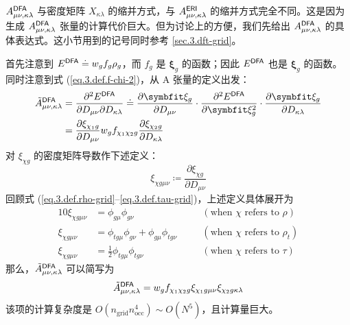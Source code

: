 $A_{\mu \nu, \kappa \lambda}^{\textsf{DFA}}$ 与密度矩阵 $X_{\kappa \lambda}$ 的缩并方式，与 $A_{\mu \nu, \kappa \lambda}^{\textsf{ERI}}$ 的缩并方式完全不同。这是因为生成 $A_{\mu \nu, \kappa \lambda}^{\textsf{DFA}}$ 张量的计算代价巨大。但为讨论上的方便，我们先给出 $A_{\mu \nu, \kappa \lambda}^{\textsf{DFA}}$ 的具体表达式。这小节用到的记号同时参考 \ref{sec.3.dft-grid}。

首先注意到 $E^{\textsf{DFA}} \doteq w_g f_g \rho_g$，而 $f_g$ 是 $\bm{\xi}_g$ 的函数；因此 $E^{\textsf{DFA}}$ 也是 $\bm{\xi}_g$ 的函数。同时注意到式 (\ref{eq.3.def.f-chi-2})，从 A 张量的定义出发：
\begin{align*}
    \tilde{A}_{\mu \nu, \kappa \lambda}^\textmt{DFA}
    &= \frac{\partial^2 E^\textmt{DFA}}{\partial D_{\mu \nu} \partial D_{\kappa \lambda}}
    \doteq \frac{\partial \bm{\xi}_g}{\partial {D_{\mu \nu}}} \cdot \frac{\partial^2 E^\textmt{DFA}}{\partial \bm{\xi}_g^2} \cdot \frac{\partial \bm{\xi}_g}{\partial {D_{\kappa \lambda}}} \\
    &= \frac{\partial \xi_{\chi_1 g}}{\partial {D_{\mu \nu}}} w_g f_{\chi_1 \chi_2 g} \frac{\partial \xi_{\chi_2 g}}{\partial {D_{\kappa \lambda}}}
\end{align*}
对 $\xi_{\chi g}$ 的密度矩阵导数作下述定义：
\begin{equation}
    \label{eq.3.def.xi-deriv-dm}
    \xi_{\chi g \mu \nu} \coloneq \frac{\partial \xi_{\chi g}}{\partial D_{\mu \nu}}
\end{equation}
回顾式 (\ref{eq.3.def.rho-grid}--\ref{eq.3.def.tau-grid})，上述定义具体展开为
\begin{alignat*}{10}
    \xi_{\chi g \mu \nu} &= \phi_{g \mu} \phi_{g \nu} &\quad& (\text{when $\chi$ refers to $\rho$}) \\
    \xi_{\chi g \mu \nu} &= \phi_{t g \mu} \phi_{g \nu} + \phi_{g \mu} \phi_{t g \nu} &\quad& (\text{when $\chi$ refers to $\rho_t$}) \\
    \xi_{\chi g \mu \nu} &= \frac{1}{2} \phi_{t g \mu} \phi_{t g \nu} &\quad& (\text{when $\chi$ refers to $\tau$})
\end{alignat*}
那么，$\tilde{A}_{\mu \nu, \kappa \lambda}^{\textsf{DFA}}$ 可以简写为
\begin{equation}
    \tilde{A}_{\mu \nu, \kappa \lambda}^{\textsf{DFA}} = w_g f_{\chi_1 \chi_2 g} \xi_{\chi_1 g \mu \nu} \xi_{\chi_2 g \kappa \lambda}
\end{equation}
该项的计算复杂度是 $O(n_\mathrm{grid} n_\mathrm{occ}^4) \sim O(N^5)$，且计算量巨大。

